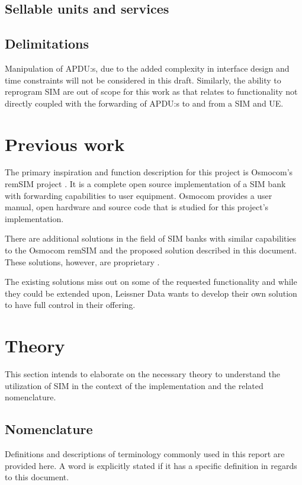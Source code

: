 \subsection{Sellable units and services}

\subsection{Delimitations}

Manipulation of APDU:s, due to the added complexity in interface
design and time constraints will not be considered in this draft.
Similarly, the ability to reprogram SIM are out of scope for this
work as that relates to functionality not directly coupled with
the forwarding of APDU:s to and from a SIM and UE.

\section{Previous work}

The primary inspiration and function description for this project
is Osmocom's remSIM project \cite{osmocom-remsim}. It is a
complete open source implementation of a SIM bank with forwarding
capabilities to user equipment. Osmocom provides a user manual,
open hardware and source code that is studied for this project's
implementation.

There are additional solutions in the field of SIM banks with
similar capabilities to the Osmocom remSIM and the proposed
solution described in this document. These solutions, however, are
proprietary \cite{CONTINUE HERE}. 

The existing solutions miss out on some of the requested
functionality and while they could be extended upon, Leissner Data
wants to develop their own solution to have full control in their
offering.

\section{Theory}

This section intends to elaborate on the necessary theory to
understand the utilization of SIM in the context of the
implementation and the related nomenclature.

\subsection{Nomenclature}

Definitions and descriptions of terminology commonly used in this
report are provided here. A word is explicitly stated if it has
a specific definition in regards to this document.

